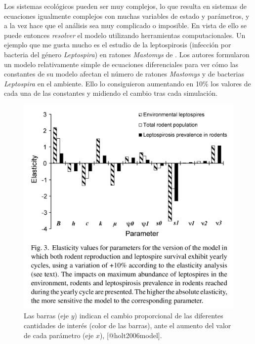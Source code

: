 \documentclass[
]{book}
\begin{document}
Los sistemas ecológicos pueden ser muy complejos, lo que resulta en sistemas de ecuaciones igualmente complejos con muchas variables de estado y parámetros, y a la vez hace que el análisis sea muy complicado o imposible. En vista de ello se puede entonces \emph{resolver} el modelo utilizando herramientas computacionales. Un ejemplo que me gusta mucho es el estudio de la leptospirosis (infección por bacteria del género \emph{Leptospira}) en ratones \emph{Mastomys} de \citet{holt2006model}. Los autores formularon un modelo relativamente simple de ecuaciones diferenciales para ver cómo las constantes de su modelo afectan el número de ratones \emph{Mastomys} y de bacterias \emph{Leptospira} en el ambiente. Ello lo consiguieron aumentando en 10\% los valores de cada una de las constantes y midiendo el cambio tras cada simulación.

\begin{figure}

{\centering \includegraphics[width=22.78in]{Unidad-I/lepto} 

}

\caption{Las barras (eje $y$) indican el cambio proporcional de las diferentes cantidades de interés (color de las barras), ante el aumento del valor de cada parámetro (eje $x$), [@holt2006model].}\label{fig:lepto}
\end{figure}
\end{document}
